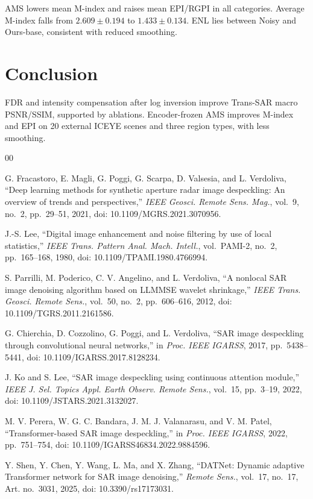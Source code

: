 \documentclass[journal]{IEEEtran}
\newcommand{\rev}[1]{{\color{RevisionBlue}#1}}
\newcommand{\condensed}[1]{{\color{CondensedGreen}#1}}
\newcommand{\rev}[1]{#1}
\newcommand{\condensed}[1]{#1}
\begin{document}
\rev{AMS lowers mean M-index and raises mean EPI/RGPI in all categories. Average M-index falls from \(2.609\pm0.194\) to \(1.433\pm0.134\). ENL lies between Noisy and Ours-base, consistent with reduced smoothing.}

\section{Conclusion}
\condensed{FDR and intensity compensation after log inversion improve Trans-SAR macro PSNR/SSIM, supported by ablations. \rev{Encoder-frozen AMS improves M-index and EPI on 20 external ICEYE scenes and three region types, with less smoothing.}}

\begin{thebibliography}{00}

G. Fracastoro, E. Magli, G. Poggi, G. Scarpa, D. Valsesia, and L. Verdoliva, ``Deep learning methods for synthetic aperture radar image despeckling: An overview of trends and perspectives,'' \emph{IEEE Geosci. Remote Sens. Mag.}, vol.~9, no.~2, pp.~29--51, 2021, doi: 10.1109/MGRS.2021.3070956.

J.-S. Lee, ``Digital image enhancement and noise filtering by use of local statistics,'' \emph{IEEE Trans. Pattern Anal. Mach. Intell.}, vol.~PAMI-2, no.~2, pp.~165--168, 1980, doi: 10.1109/TPAMI.1980.4766994.

S. Parrilli, M. Poderico, C. V. Angelino, and L. Verdoliva, ``A nonlocal SAR image denoising algorithm based on LLMMSE wavelet shrinkage,'' \emph{IEEE Trans. Geosci. Remote Sens.}, vol.~50, no.~2, pp.~606--616, 2012, doi: 10.1109/TGRS.2011.2161586.

G. Chierchia, D. Cozzolino, G. Poggi, and L. Verdoliva, ``SAR image despeckling through convolutional neural networks,'' in \emph{Proc. IEEE IGARSS}, 2017, pp.~5438--5441, doi: 10.1109/IGARSS.2017.8128234.

J. Ko and S. Lee, ``SAR image despeckling using continuous attention module,'' \emph{IEEE J. Sel. Topics Appl. Earth Observ. Remote Sens.}, vol.~15, pp.~3--19, 2022, doi: 10.1109/JSTARS.2021.3132027.

M. V. Perera, W. G. C. Bandara, J. M. J. Valanarasu, and V. M. Patel, ``Transformer-based SAR image despeckling,'' in \emph{Proc. IEEE IGARSS}, 2022, pp.~751--754, doi: 10.1109/IGARSS46834.2022.9884596.

Y. Shen, Y. Chen, Y. Wang, L. Ma, and X. Zhang, ``DATNet: Dynamic adaptive Transformer network for SAR image denoising,'' \emph{Remote Sens.}, vol.~17, no.~17, Art. no.~3031, 2025, doi: 10.3390/rs17173031.


\end{thebibliography}
\end{document}
